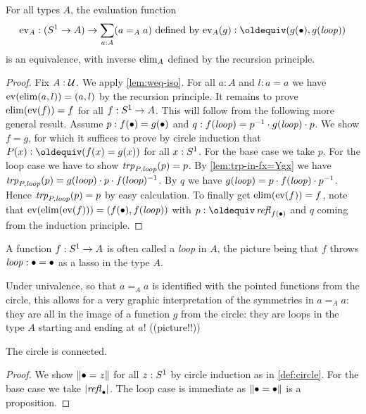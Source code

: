 \begin{lemma}\label{lem:freeloopspace}
For all types $A$, the evaluation function 
\[
\ev_A : (\Sc\to A)\to \sum_{a:A}(a=_Aa)\text{~defined by~} 
\ev_A(g)\defeq (g(\base),g(\Sloop))
\]
is an equivalence, with inverse $\mathrm{elim}_A$ defined by the recursion principle.  
\end{lemma}
\begin{proof}
Fix $A:\mathcal{U}$. We apply \cref{lem:weq-iso}. 
For all $a:A$ and $l:a=a$ we have $\mathrm{ev}(\mathrm{elim}(a,l))=(a,l)$
by the recursion principle. It remains to prove
$\mathrm{elim}(\mathrm{ev}(f))=f$ for all $f:S^1\to A$. This will follow
from the following more general result. Assume 
$p: f(\bullet)= g(\bullet)$ and $q: f(\mathit{loop}) = p^{-1}\cdot g(\mathit{loop})\cdot p$.
We show $f=g$, for which it suffices to prove by circle induction
that $P(x)\defeq(f(x)=g(x))$ for all $x:S^1$.
For the base case we take $p$.
For the loop case we have to show $\mathord{\mathit{trp}}_{P,\mathit{loop}}(p)=p$.
By \cref{lem:trp-in-fx=Ygx} we have 
$\mathord{\mathit{trp}}_{P,\mathit{loop}}(p)=g(loop)\cdot p \cdot f(loop)^{-1}$. 
By $q$ we have $g(\mathit{loop}) = p\cdot f(\mathit{loop}) \cdot p^{-1}$.
Hence $\mathord{\mathit{trp}}_{P,\mathit{loop}}(p)=p$ by easy calculation.
To finally get $\mathrm{elim}(\mathrm{ev}(f))=f$,
note that $\mathrm{ev}(\mathrm{elim}(\mathrm{ev}(f)))=(f(\bullet),f(\mathit{loop}))$ with $p\defeq\refl{f(\base)}$
and $q$ coming from the induction principle.
\end{proof}

\begin{remark}
A function $f:S^1\to A$ is often called a \emph{loop} in $A$, 
the picture being that $f$ throws $\mathit{loop}:\bullet=\bullet$ as a lasso in the type $A$.

  Under univalence, so that $a=_Aa$ is identified with the pointed functions 
from the circle, this allows for a very graphic interpretation of the 
symmetries in $a=_Aa$: they are all in the image of a function $g$ from 
the circle: they are loops in the type $A$ starting and ending at $a$! ((picture!!))
\end{remark}

\begin{lemma}\label{lem:circleisconnected}
  The circle is connected.
\end{lemma}
\begin{proof}
We show $\lVert\bullet=z\rVert$ for all $z:S^1$ by circle induction
as in \cref{def:circle}.
For the base case we take $\lvert\mathop{{\it refl}_{\bullet}}\rvert$.
The loop case is immediate as $\lVert\bullet=\bullet\rVert$ is a proposition.
\end{proof}


